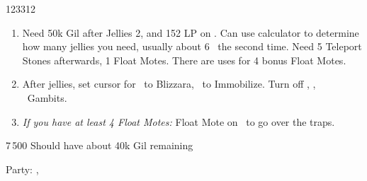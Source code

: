 \begin{shop}{123312}
\end{shop}
\begin{enumerate}
	\item Need 50k Gil after Jellies 2, and 152 LP on \penelo. Can use calculator to determine how many jellies you need, usually about 6~ the second time. Need 5 Teleport Stones afterwards, 1 Float Motes. There are uses for 4 bonus Float Motes.
	\item After jellies, set cursor for \ashe\ to Blizzara, \penelo\ to Immobilize. Turn off \vaan, \ashe, \penelo\ Gambits.
	\item \textit{If you have at least 4 Float Motes:} Float Mote on \vaan\ to go over the traps.
\end{enumerate}
\begin{shop}{7\,500}
	Should have about 40k Gil remaining
\end{shop}
\begin{menu}
Party: \vaan, \basch
\end{menu}
